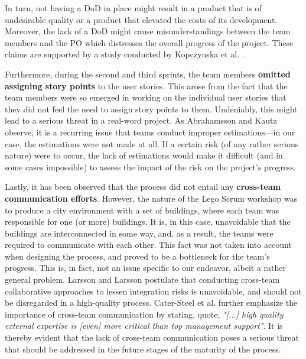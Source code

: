 \documentclass[conference]{IEEEtran}
\begin{document}
In turn, not having a DoD in place might result in a product that is of
undesirable quality or a product that elevated the costs of its development.
Moreover, the lack of a DoD might cause misunderstandings between the team
members and the PO which distresses the overall progress of the project. These
claims are supported by a study conducted by Kopczynska et al.
\cite{Kopczynska2022}.

Furthermore, during the second and third sprints, the team members \textbf{omitted
assigning story points} to the user stories. This arose from the fact that the
team members were so emerged in working on the individual user stories that
they did not feel the need to assign story points to them. Undeniably, this
might lead to a serious threat in a real-word project. As Abrahamsson and Kautz
\cite{Abrahamsson2002} observe, it is a recurring issue that teams conduct improper
estimations---in our case, the estimations were not made at all. If a certain
risk (of any rather serious nature) were to occur, the lack of estimations
would make it difficult (and in some cases impossible) to assess the impact of
the risk on the project's progress.

Lastly, it has been observed that the process did not entail any \textbf{cross-team
communication efforts}. However, the nature of the Lego Scrum workshop was to
produce a city environment with a set of buildings, where each team was
responsible for one (or more) buildings. It is, in this case, unavoidable that
the buildings are interconnected in some way, and, as a result, the teams were
required to communicate with each other. This fact was not taken
into account when designing the process, and proved to be a bottleneck for the
team's progress. This is, in fact, not an issue specific to our endeavor,
albeit a rather general problem. Larsson and Larsson \cite{Larsson2020}
postulate that conducting cross-team collaborative approaches to lessen
integration risks is unavoidable, and should not be disregarded in a
high-quality process. Cater-Steel et al. \cite{CaterSteel2006} further
emphasize the importance of cross-team communication by stating, quote,
\textit{"[...] high quality external expertise is [even] more critical than top
management support"}. It is thereby evident that the lack of cross-team
communication poses a serious threat that should be addressed in the future
stages of the maturity of the process.
\end{document}
